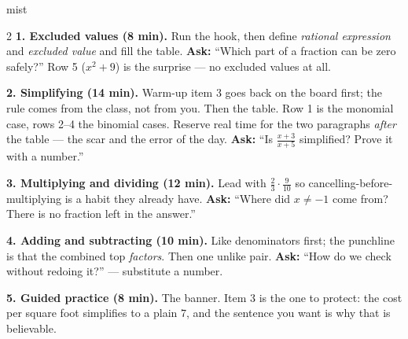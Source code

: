 \documentclass[10pt]{article}
\begin{document}
\boxguard
\begin{skillbox}[Lesson]{mist}
\begin{multicols}{2}
\textbf{1. Excluded values (8 min).} Run the hook, then define \emph{rational expression} and
\emph{excluded value} and fill the table. \textbf{Ask:} ``Which part of a fraction can be zero
safely?'' Row 5 ($x^2+9$) is the surprise --- no excluded values at all.

\textbf{2. Simplifying (14 min).} Warm-up item 3 goes back on the board first; the rule comes from
the class, not from you. Then the table. Row 1 is the monomial case, rows 2--4 the binomial cases.
Reserve real time for the two paragraphs \emph{after} the table --- the scar and the error of the
day. \textbf{Ask:} ``Is $\tfrac{x+3}{x+5}$ simplified? Prove it with a number.''

\textbf{3. Multiplying and dividing (12 min).} Lead with $\tfrac23 \cdot \tfrac{9}{10}$ so
cancelling-before-multiplying is a habit they already have. \textbf{Ask:} ``Where did $x \ne -1$
come from? There is no fraction left in the answer.''

\textbf{4. Adding and subtracting (10 min).} Like denominators first; the punchline is that the
combined top \emph{factors}. Then one unlike pair. \textbf{Ask:} ``How do we check without redoing
it?'' --- substitute a number.

\textbf{5. Guided practice (8 min).} The banner. Item 3 is the one to protect: the cost per square
foot simplifies to a plain $7$, and the sentence you want is why that is believable.
\end{multicols}
\end{skillbox}
\end{document}
